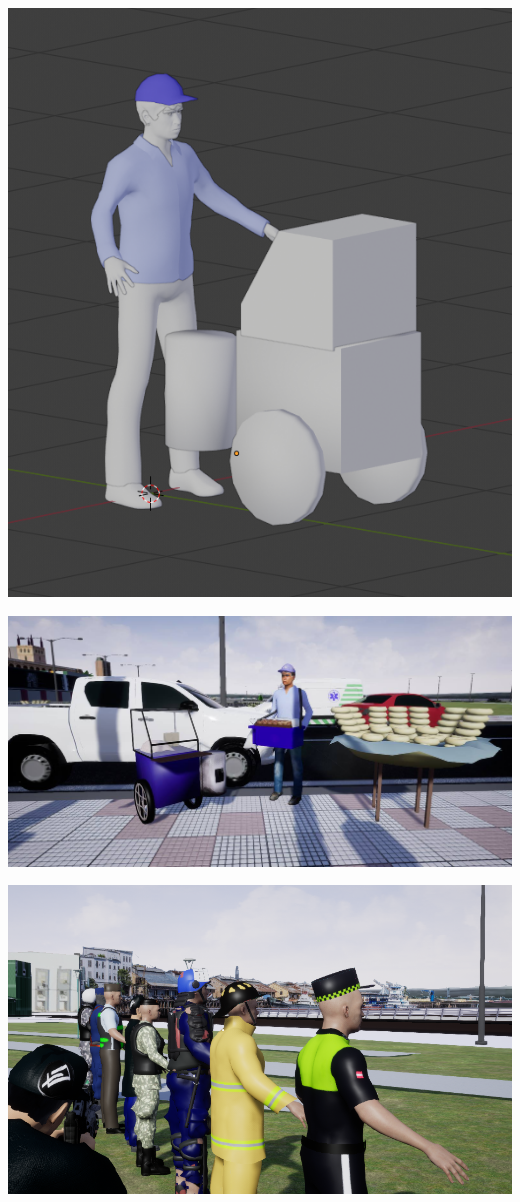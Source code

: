 \documentclass{article}
\begin{document}
  \includegraphics[width=\textwidth]{82.png}

  \includegraphics[width=\textwidth]{83.jpg}

  \includegraphics[width=\textwidth]{84.png}
\end{document}
